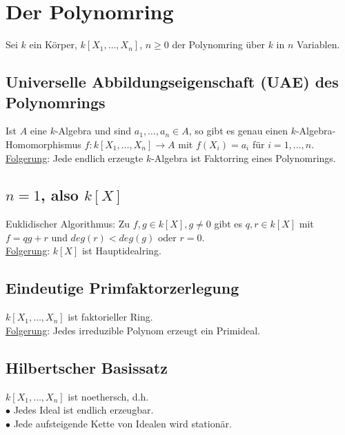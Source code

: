 \documentclass[a4paper,12pt]{report}
\theoremstyle{break}
\theoremstyle{nonumberbreak}
\theoremstyle{nonumberplain}
\begin{document}
\section{Der Polynomring}
Sei $k$ ein Körper, $k[X_1,\dots,X_n]$, $n\geq 0$ der Polynomring über $k$ in $n$ Variablen.
\subsection*{Universelle Abbildungseigenschaft (UAE) des Polynomrings}
Ist $A$ eine $k$-Algebra und sind $a_1,\dots,a_n\in A$, so gibt es genau einen $k$-Algebra-Homomorphismus $f: k[X_1,\dots,X_n] \rightarrow A$ mit $f(X_i)=a_i$ für $i= 1,\dots,n$.\\
\underline{Folgerung}: Jede endlich erzeugte $k$-Algebra ist Faktorring eines Polynomrings.
\subsection*{$n=1$, also $k[X]$}
Euklidischer Algorithmus: Zu $f,g\in k[X], g\neq 0$ gibt es $q,r \in k[X]$ mit $f=qg+r$ und $deg(r)<deg(g)$ oder $r=0$.\\
\underline{Folgerung}: $k[X]$ ist Hauptidealring.
\subsection*{Eindeutige Primfaktorzerlegung}
$k[X_1,\dots,X_n]$ ist faktorieller Ring.\\
\underline{Folgerung}: Jedes irreduzible Polynom erzeugt ein Primideal.
\subsection*{Hilbertscher Basissatz}
$k[X_1,\dots,X_n]$ ist noethersch, d.h.\\
$\bullet$ Jedes Ideal ist endlich erzeugbar.\\
$\bullet$ Jede aufsteigende Kette von Idealen wird stationär.
\end{document}
